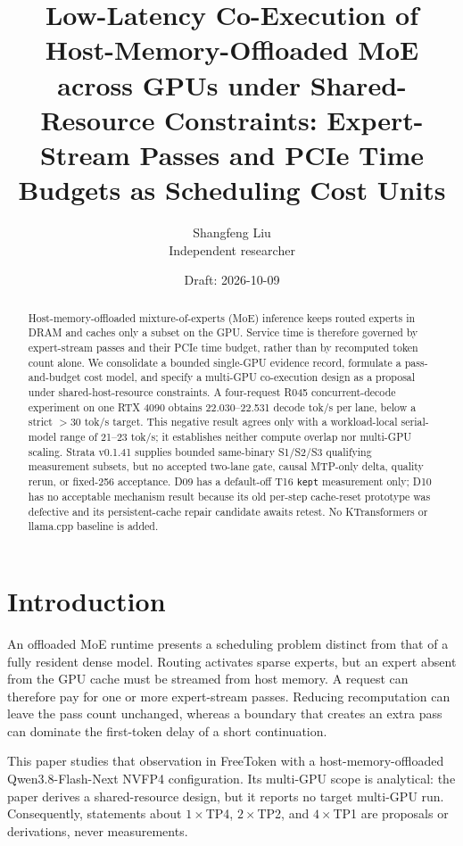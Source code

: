 \documentclass[11pt]{article}
\title{Low-Latency Co-Execution of Host-Memory-Offloaded MoE across GPUs under Shared-Resource Constraints: Expert-Stream Passes and PCIe Time Budgets as Scheduling Cost Units}
\author{Shangfeng Liu\\Independent researcher}
\date{Draft: 2026-10-09}
\begin{document}
\maketitle

\begin{abstract}
Host-memory-offloaded mixture-of-experts (MoE) inference keeps routed experts in DRAM and caches only a subset on the GPU. Service time is therefore governed by expert-stream passes and their PCIe time budget, rather than by recomputed token count alone. We consolidate a bounded single-GPU evidence record, formulate a pass-and-budget cost model, and specify a multi-GPU co-execution design as a proposal under shared-host-resource constraints. A four-request R045 concurrent-decode experiment on one RTX 4090 obtains 22.030--22.531 decode tok/s per lane, below a strict $>30$ tok/s target. This negative result agrees only with a workload-local serial-model range of 21--23 tok/s; it establishes neither compute overlap nor multi-GPU scaling. Strata v0.1.41 supplies bounded same-binary S1/S2/S3 qualifying measurement subsets, but no accepted two-lane gate, causal MTP-only delta, quality rerun, or fixed-256 acceptance. D09 has a default-off T16 \texttt{kept} measurement only; D10 has no acceptable mechanism result because its old per-step cache-reset prototype was defective and its persistent-cache repair candidate awaits retest. No KTransformers or llama.cpp baseline is added.
\end{abstract}

\section{Introduction}

An offloaded MoE runtime presents a scheduling problem distinct from that of a fully resident dense model. Routing activates sparse experts, but an expert absent from the GPU cache must be streamed from host memory. A request can therefore pay for one or more expert-stream passes. Reducing recomputation can leave the pass count unchanged, whereas a boundary that creates an extra pass can dominate the first-token delay of a short continuation.

This paper studies that observation in FreeToken with a host-memory-offloaded Qwen3.8-Flash-Next NVFP4 configuration. Its multi-GPU scope is analytical: the paper derives a shared-resource design, but it reports no target multi-GPU run. Consequently, statements about $1\times$TP4, $2\times$TP2, and $4\times$TP1 are proposals or derivations, never measurements.
\end{document}
